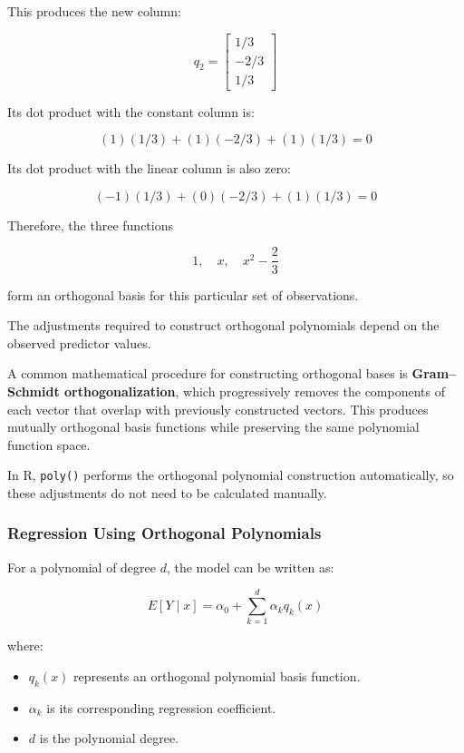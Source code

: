 \documentclass[
  letterpaper,
  DIV=11,
  numbers=noendperiod]{scrreprt}
\providecommand{\tightlist}{%
  \setlength{\itemsep}{0pt}\setlength{\parskip}{0pt}}
\begin{document}
This produces the new column:

\[
q_2=
\begin{bmatrix}
1/3\\
-2/3\\
1/3
\end{bmatrix}
\]

Its dot product with the constant column is:

\[
(1)(1/3)+(1)(-2/3)+(1)(1/3)=0
\]

Its dot product with the linear column is also zero:

\[
(-1)(1/3)+(0)(-2/3)+(1)(1/3)=0
\]

Therefore, the three functions

\[
1,\quad x,\quad x^2-\frac{2}{3}
\]

form an orthogonal basis for this particular set of observations.

The adjustments required to construct orthogonal polynomials depend on
the observed predictor values.

A common mathematical procedure for constructing orthogonal bases is
\textbf{Gram--Schmidt orthogonalization}, which progressively removes
the components of each vector that overlap with previously constructed
vectors. This produces mutually orthogonal basis functions while
preserving the same polynomial function space.

In R, \texttt{poly()} performs the orthogonal polynomial construction
automatically, so these adjustments do not need to be calculated
manually.

\subsubsection{Regression Using Orthogonal
Polynomials}\label{regression-using-orthogonal-polynomials}

For a polynomial of degree \(d\), the model can be written as:

\[
E[Y\mid x]
=
\alpha_0+\sum_{k=1}^{d}\alpha_kq_k(x)
\]

where:

\begin{itemize}
\tightlist
\item
  \(q_k(x)\) represents an orthogonal polynomial basis function.
\item
  \(\alpha_k\) is its corresponding regression coefficient.
\item
  \(d\) is the polynomial degree.
\end{itemize}
\end{document}
